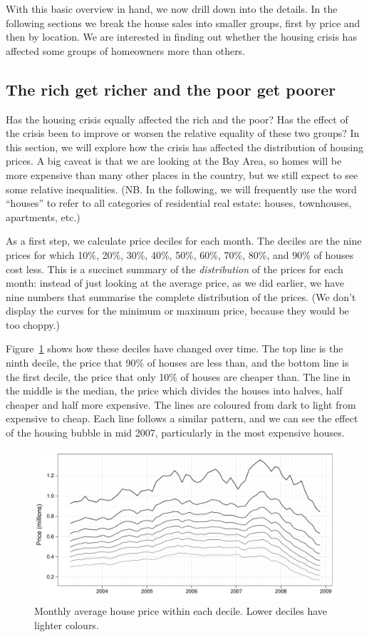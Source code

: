 \documentclass[oneside]{article}
\begin{document}
With this basic overview in hand, we now drill down into the details. In the following sections we break the house sales into smaller groups, first by price and then by location.  We are interested in finding out whether the housing crisis has affected some groups of homeowners more than others.

\subsection{The rich get richer and the poor get poorer}

Has the housing crisis equally affected the rich and the poor?  Has the effect of the crisis been to improve or worsen the relative equality of these two groups?  In this section, we will explore how the crisis has affected the distribution of housing prices.  A big caveat is that we are looking at the Bay Area, so homes will be more expensive than many other places in the country, but we still expect to see some relative inequalities.  (NB.  In the following, we will frequently use the word ``houses'' to refer to all categories of residential real estate: houses, townhouses, apartments, etc.)

As a first step, we calculate price deciles for each month.  The deciles are the nine prices for which 10\%, 20\%, 30\%, 40\%, 50\%, 60\%, 70\%, 80\%, and 90\% of houses cost less.  This is a succinct summary of the {\it distribution} of the prices for each month: instead of just looking at the average price, as we did earlier, we have nine numbers that summarise the complete distribution of the prices.   (We don't display the curves for the minimum or maximum price, because they would be too choppy.)

Figure~\ref{fig:decile-raw} shows how these deciles have changed over time.  The top line is the ninth decile, the price that 90\% of houses are less than, and the bottom line is the first decile, the price that only 10\% of houses are cheaper than.  The line in the middle is the median, the price which divides the houses into halves, half cheaper and half more expensive.  The lines are coloured from dark to light from expensive to cheap.  Each line follows a similar pattern, and we can see the effect of the housing bubble in mid 2007, particularly in the most expensive houses.  

\begin{figure}[htbp]
  \centering
  \includegraphics[width=0.75\linewidth]{decile-raw}
  \caption{Monthly average house price within each decile.  Lower deciles have lighter colours.} 
  \label{fig:decile-raw}
\end{figure}
\end{document}
